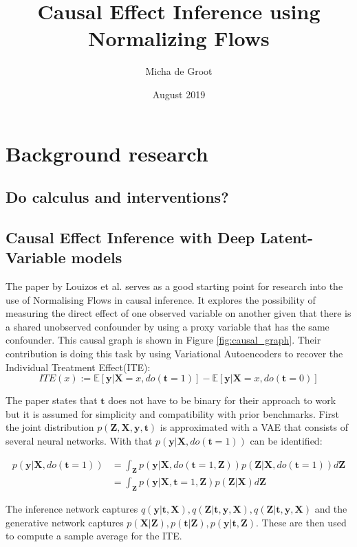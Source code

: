 \documentclass{article}
\title{Causal Effect Inference using Normalizing Flows}
\author{Micha de Groot}
\date{August 2019}
\newcommand{\bt}{\mathbf{t}}
\newcommand{\bX}{\mathbf{X}}
\newcommand{\by}{\mathbf{y}}
\newcommand{\bZ}{\mathbf{Z}}
\begin{document}
\section{Background research}

\subsection*{Do calculus and interventions?}



\subsection*{Causal Effect Inference with Deep Latent-Variable models}
The paper by Louizos et al.\cite{louizos2017causal} serves as a good starting point for research into the use of Normalising Flows in causal inference. It explores the possibility of measuring the direct effect of one observed variable on another given that there is a shared unobserved confounder by using a proxy variable that has the same confounder. This causal graph is shown in Figure \ref{fig:causal_graph}. Their contribution is doing this task by using Variational Autoencoders\cite{kingma2013auto} to recover the Individual Treatment Effect(ITE):
\begin{equation}\label{equation:ITE}
    ITE(x) := \mathbb{E}[\by | \bX = x, do(\bt = 1)] - \mathbb{E}[\by | \bX = x, do(\bt=0)]
\end{equation}

\noindent
The paper states that $\bt$ does not have to be binary for their approach to work but it is assumed for simplicity and compatibility with prior benchmarks. First the joint distribution $p(\bZ, \bX, \by, \bt)$ is approximated with a VAE that consists of several neural networks. With that $p(\by | \bX, do(\bt=1))$ can be identified:

\begin{equation}\label{equation:intervention}
    \begin{split}
    p(\by | \bX, do(\bt=1)) &= \int_\bZ p(\by | \bX, do(\bt=1, \bZ)) p(\bZ | \bX, do(\bt = 1)) d\bZ \\
                            &= \int_\bZ p(\by | \bX, \bt = 1, \bZ) p(\bZ | \bX) d\bZ
    \end{split}
\end{equation}

\noindent
The inference network captures $q(\by | \bt , \bX), q(\bZ | \bt, \by, \bX), q(\bZ| \bt, \by, \bX)$ and the generative network captures $p(\bX | \bZ), p(\bt | \bZ), p(\by | \bt, \bZ)$. These are then used to compute a sample average for the ITE.
\end{document}
